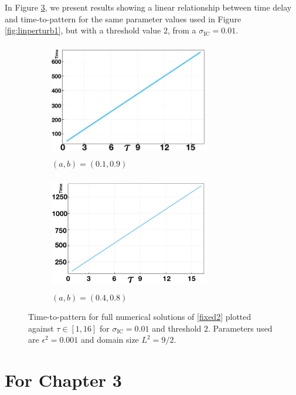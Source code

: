 In Figure \ref{fig:Bbif4}, we present results showing a linear relationship between time delay and time-to-pattern for the same parameter values used in Figure \ref{fig:linperturb1}, but with a threshold value $2$, from a $\sigma_{\text{IC}}=0.01$.

\begin{figure}[H]
   \centering
   \begin{subfigure}[t]{0.45\textwidth}
       \centering
       \includegraphics[width=7cm,height=5cm]{longlin1.png}
       \caption{$(a,b)=(0.1,0.9)$}
       \label{}
   \end{subfigure}
   \hfill
   \begin{subfigure}[t]{0.45\textwidth}
       \centering
       \includegraphics[width=7cm,height=5cm]{longlin4.png}
       \caption{$(a,b)=(0.4,0.8)$}
       \label{}
   \end{subfigure}
   \caption{Time-to-pattern for full numerical solutions of \eqref{fixed2} plotted against $\tau\in[1,16]$ for $\sigma_{\text{IC}}=0.01$ and threshold $2$. Parameters used are $\epsilon^2=0.001$ and domain size $L^2=9/2$.}
   \label{fig:Bbif4}
\end{figure}


\section{For Chapter 3}\label{section:Bdist}
